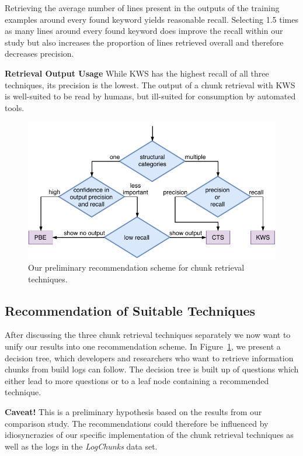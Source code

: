 Retrieving the average number of lines present in the outputs of the
training examples around every found keyword yields reasonable recall.
Selecting 1.5 times as many lines around every found keyword does
improve the recall within our study but also increases the proportion
of lines retrieved overall and therefore decreases precision.

\noindent
\textbf{Retrieval Output Usage}
While KWS has the highest recall of all three techniques, its
precision is the lowest. The output of a chunk retrieval with KWS is
well-suited to be read by humans, but ill-suited for consumption by
automated tools.

\begin{figure}[tb]
		\centering
		\includegraphics[width=\columnwidth, clip]{img/crt-recommendation.pdf}
		\caption{Our preliminary recommendation scheme for chunk retrieval techniques.}
		\label{fig:crt-recommendation}
\end{figure}

\subsection{Recommendation of Suitable Techniques}
After discussing the three chunk retrieval techniques separately we
now want to unify our results into one recommendation scheme. In
Figure~\ref{fig:crt-recommendation}, we present a decision tree, which
developers and researchers who want to retrieve information chunks
from build logs can follow. The decision tree is built up of questions
which either lead to more questions or to a leaf node containing a
recommended technique. 

\noindent
\textbf{Caveat!} This is a preliminary hypothesis based on the results
from our comparison study. The recommendations could therefore be
influenced by idiosyncrazies of our specific implementation of the
chunk retrieval techniques as well as the logs in the \emph{LogChunks}
data set.

